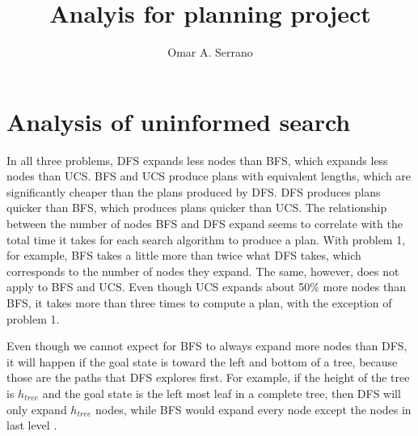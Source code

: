 \documentclass[10pt,a4paper]{article}
\title{Analyis for planning project}
\author{Omar A. Serrano}
\begin{document}
\maketitle

\section*{Analysis of uninformed search}

In all three problems, DFS expands less nodes than BFS, which expands less nodes
than UCS. BFS and UCS produce plans with equivalent lengths, which are
significantly cheaper than the plans produced by DFS. DFS produces plans quicker
than BFS, which produces plans quicker than UCS. The relationship between the
number of nodes BFS and DFS expand seems to correlate with the total time it
takes for each search algorithm to produce a plan. With problem 1, for example,
BFS takes a little more than twice what DFS takes, which corresponds to the
number of nodes they expand. The same, however, does not apply to BFS and UCS.
Even though UCS expands about 50\% more nodes than BFS, it takes more than three
times to compute a plan, with the exception of problem 1.

Even though we cannot expect for BFS to always expand more nodes than DFS, it
will happen if the goal state is toward the left and bottom of a tree, because
those are the paths that DFS explores first. For example, if the height of the
tree is $h_{tree}$ and the goal state is the left most leaf in a complete
tree, then DFS will only expand $h_{tree}$ nodes, while BFS would expand
every node except the nodes in last level \cite{1}.

\hfill \break
\end{document}
